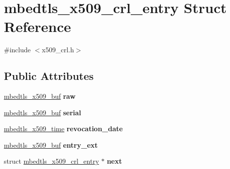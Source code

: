 \hypertarget{structmbedtls__x509__crl__entry}{\section{mbedtls\-\_\-x509\-\_\-crl\-\_\-entry Struct Reference}
\label{structmbedtls__x509__crl__entry}
}


{\ttfamily \#include $<$x509\-\_\-crl.\-h$>$}

\subsection*{Public Attributes}
\begin{DoxyCompactItemize}
\item 
\hypertarget{structmbedtls__x509__crl__entry_aa629ec226c2e624eb1bf72f4d5c2cc8d}{\hyperlink{group__x509__module_ga4d02c9e8e4e2934555e0d132cd2976dc}{mbedtls\-\_\-x509\-\_\-buf} {\bfseries raw}}\label{structmbedtls__x509__crl__entry_aa629ec226c2e624eb1bf72f4d5c2cc8d}

\item 
\hypertarget{structmbedtls__x509__crl__entry_a2cbc8acba11f2040948532389218741d}{\hyperlink{group__x509__module_ga4d02c9e8e4e2934555e0d132cd2976dc}{mbedtls\-\_\-x509\-\_\-buf} {\bfseries serial}}\label{structmbedtls__x509__crl__entry_a2cbc8acba11f2040948532389218741d}

\item 
\hypertarget{structmbedtls__x509__crl__entry_abb22e83d676a60bfd93bb6e3960daa3e}{\hyperlink{structmbedtls__x509__time}{mbedtls\-\_\-x509\-\_\-time} {\bfseries revocation\-\_\-date}}\label{structmbedtls__x509__crl__entry_abb22e83d676a60bfd93bb6e3960daa3e}

\item 
\hypertarget{structmbedtls__x509__crl__entry_a5803a38521d5dbfd7240b364bde540a5}{\hyperlink{group__x509__module_ga4d02c9e8e4e2934555e0d132cd2976dc}{mbedtls\-\_\-x509\-\_\-buf} {\bfseries entry\-\_\-ext}}\label{structmbedtls__x509__crl__entry_a5803a38521d5dbfd7240b364bde540a5}

\item 
\hypertarget{structmbedtls__x509__crl__entry_abb908815d7bcf91ff87992682efe33b0}{struct \hyperlink{structmbedtls__x509__crl__entry}{mbedtls\-\_\-x509\-\_\-crl\-\_\-entry} $\ast$ {\bfseries next}}\label{structmbedtls__x509__crl__entry_abb908815d7bcf91ff87992682efe33b0}

\end{DoxyCompactItemize}


